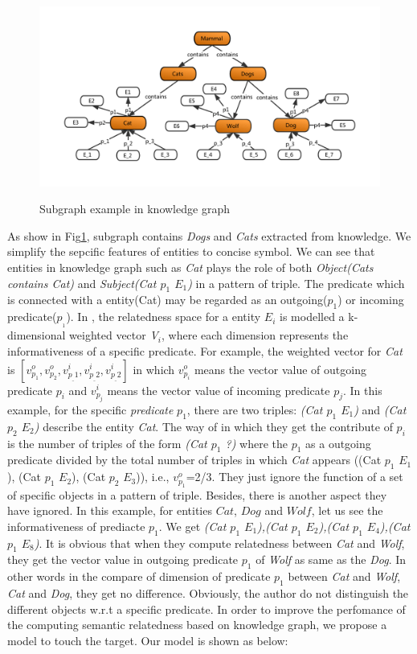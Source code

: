 \begin{figure}
    \centering
    \includegraphics[width=1.0\textwidth]{pic/introduction.pdf}\\
    \caption{Subgraph example in knowledge graph}
    \label{weak1}
\end{figure}

As show in Fig\ref{weak1}, subgraph contains \emph{Dogs} and \emph{Cats} extracted from
knowledge. We simplify the sepcific features of entities to concise symbol. 
We can see that entities in knowledge graph such as \emph{Cat} plays the role 
of both \emph{Object(Cats contains Cat)} and \emph{Subject(Cat $p_1$ $E_1$)}
in a pattern of triple. The predicate which is connected with a entity(Cat)
may be regarded as an outgoing($p_1$) or incoming predicate($p_{_1}$).
In \cite{aaai/Pirro12}, the relatedness space for a entity ${E_i}$ is modelled a 
k-dimensional weighted vector \emph{V$_i$}, where each dimension represents
the informativeness of a specific predicate.
For example, the weighted vector for \emph{Cat} is 
$[v_{p_1}^o, v_{p_2}^o, v_{p_\_1}^i, v_{p_\_2}^i, v_{p_\_2}^i]$ in which $v_{p_i}^o$ 
means the vector value of outgoing predicate $p_i$ and $v_{p_j}^i$ 
means the vector value of incoming predicate $p_j$. 
In this example, for the specific \emph{predicate} $p_1$, there are two triples:
\emph{(Cat $p_1$ $E_1$)} and \emph{(Cat $p_2$ $E_2$)} describe the entity \emph{Cat}.
The way of \cite{aaai/Pirro12} in which they get the contribute of $p_i$ is the number
of triples of the form \emph{(Cat $p_1$ ?)} where the $p_1$ as a outgoing predicate
divided by the total number of triples in which \emph{Cat} appears
((Cat $p_1$ $E_1$), (Cat $p_1$ $E_2$), (Cat $p_2$ $E_3$)), i.e., $v_{p_1}^o$=2/3.
They just ignore the function of a set of specific objects in a pattern of triple.
Besides, there is another aspect they have ignored. In this example, for entities $Cat$,
$Dog$ and $Wolf$, let us see the informativeness of prediacte $p_1$. We get
\emph{{(Cat $p_1$ $E_1$),(Cat $p_1$ $E_2$),(Cat $p_1$ $E_4$),(Cat $p_1$ $E_8$)}}. 
It is obvious that when they compute relatedness between \emph{Cat} and \emph{Wolf}, they get the
vector value in outgoing predicate $p_1$ of \emph{Wolf} as same as the \emph{Dog}.
In other words in the compare of dimension of predicate $p_1$ between \emph{Cat} and \emph{Wolf},
\emph{Cat} and \emph{Dog}, they get no difference. Obviously, the author do not distinguish the different 
objects w.r.t a specific predicate. In order to improve the perfomance of the computing
semantic relatedness based on knowledge graph, we propose a model to touch 
the target. Our model is shown as below:

